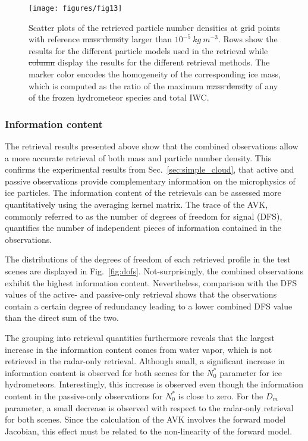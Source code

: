 \documentclass[journal abbreviation, manuscript]{copernicus}
\providecommand{\DIFadd}[1]{{\protect\color{blue}\uwave{#1}}} %
\providecommand{\DIFdel}[1]{{\protect\color{red}\sout{#1}}}                      %
\providecommand{\DIFaddFL}[1]{\DIFadd{#1}} %
\providecommand{\DIFdelFL}[1]{\DIFdel{#1}} %
\providecommand{\DIFaddbeginFL}{} %
\providecommand{\DIFaddendFL}{} %
\providecommand{\DIFdelbeginFL}{} %
\providecommand{\DIFdelendFL}{} %
\begin{document}
\begin{figure}
\centering
\texttt{[image: figures/fig13]}
\caption{Scatter plots of the retrieved particle number densities at grid points
  with reference \DIFdelbeginFL \DIFdelFL{mass density }\DIFdelendFL \DIFaddbeginFL \DIFaddFL{IWC }\DIFaddendFL larger than $10^{-5}\ \unit{kg\ m^{-3}}$. Rows show
  the results for the different particle models used in the retrieval while
  \DIFdelbeginFL \DIFdelFL{column }\DIFdelendFL \DIFaddbeginFL \DIFaddFL{columns }\DIFaddendFL display the results for the different retrieval methods. The marker
  color encodes the homogeneity of the corresponding ice mass, which is computed
  as the ratio of the maximum \DIFdelbeginFL \DIFdelFL{mass density }\DIFdelendFL \DIFaddbeginFL \DIFaddFL{water content }\DIFaddendFL of any of the frozen hydrometeor
  species and total IWC.}
\label{fig:results_nd_scatter_a}
\end{figure}

\subsubsection{Information content}

The retrieval results presented above show that the combined observations allow
a more accurate retrieval of both mass and particle number density. This
confirms the experimental results from Sec.~\ref{sec:simple_cloud}, that active
and passive observations provide complementary information on the microphysics
of ice particles. The information content of the retrievals can be assessed more
quantitatively using the averaging kernel matrix. The trace of the AVK, commonly
referred to as the number of degrees of freedom for signal (DFS), quantifies the
number of independent pieces of information contained in the observations.

The distributions of the degrees of freedom of each retrieved profile in the
test scenes are displayed in Fig.~\ref{fig:dofs}. Not-surprisingly, the combined
observations exhibit the highest information content. Nevertheless, comparison
with the DFS values of the active- and passive-only retrieval shows that the
observations contain a certain degree of redundancy leading to a lower combined
DFS value than the direct sum of the two.

The grouping into retrieval quantities furthermore reveals that the largest
increase in the information content comes from water vapor, which is not
retrieved in the radar-only retrieval. Although small, a significant increase in
information content is observed for both scenes for the $N_0^*$ parameter for
ice hydrometeors. Interestingly, this increase is observed even though the
information content in the passive-only observations for $N_0^*$ is close to
zero. For the $D_m$ parameter, a small decrease is observed with respect to the
radar-only retrieval for both scenes. Since the calculation of the AVK involves
the forward model Jacobian, this effect must be related to the non-linearity of
the forward model.
\end{document}
